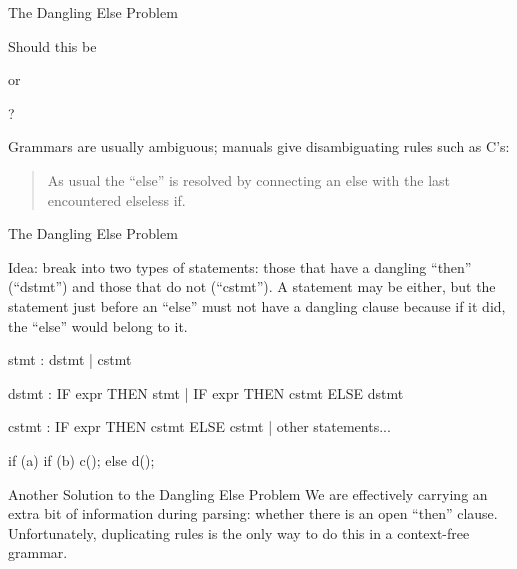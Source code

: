 \documentclass{plt}
\begin{document}
\begin{frame}{The Dangling Else Problem}

\hfil
Should this be
\hfil
{}
\hfil
or
\hfil
{}
\hfil
?

Grammars are usually ambiguous; manuals give disambiguating rules such 
as C's:

\begin{quotation}
\noindent
As usual the ``else'' is resolved by connecting
an else with the last encountered elseless if.
\end{quotation}


\end{frame}


\begin{frame}[fragile]{The Dangling Else Problem}

Idea: break into two types of statements: those that have a dangling
``then'' (``dstmt'') and those that do not (``cstmt'').  A statement may be
either, but the statement just before an ``else'' must not have a
dangling clause because if it did, the ``else'' would belong to it.

\begin{ocamlyacc}
stmt : dstmt
     | cstmt

dstmt : IF expr THEN stmt
      | IF expr THEN cstmt ELSE dstmt

cstmt : IF expr THEN cstmt ELSE cstmt
      | other statements...
\end{ocamlyacc}

\begin{center}\ttfamily
if (a) if (b) c(); else d();
\end{center}
\end{frame}

\begin{frame}[fragile]{Another Solution to the Dangling Else Problem}
We are effectively carrying an extra bit of information during
parsing: whether there is an open ``then'' clause.  Unfortunately,
duplicating rules is the only way to do this in a context-free grammar.

\end{frame}
\end{document}
